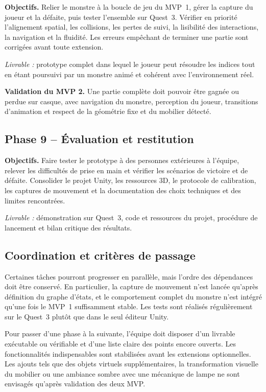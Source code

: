 \documentclass[11pt,a4paper]{article}
\begin{document}
\textbf{Objectifs.} Relier le monstre à la boucle de jeu du MVP~1, gérer la capture du joueur et la défaite, puis tester l'ensemble sur Quest~3. Vérifier en priorité l'alignement spatial, les collisions, les pertes de suivi, la lisibilité des interactions, la navigation et la fluidité. Les erreurs empêchant de terminer une partie sont corrigées avant toute extension.

\textit{Livrable :} prototype complet dans lequel le joueur peut résoudre les indices tout en étant poursuivi par un monstre animé et cohérent avec l'environnement réel.

\textbf{Validation du MVP 2.} Une partie complète doit pouvoir être gagnée ou perdue sur casque, avec navigation du monstre, perception du joueur, transitions d'animation et respect de la géométrie fixe et du mobilier détecté.

\subsection*{Phase 9 -- Évaluation et restitution}

\textbf{Objectifs.} Faire tester le prototype à des personnes extérieures à l'équipe, relever les difficultés de prise en main et vérifier les scénarios de victoire et de défaite. Consolider le projet Unity, les ressources 3D, le protocole de calibration, les captures de mouvement et la documentation des choix techniques et des limites rencontrées.

\textit{Livrable :} démonstration sur Quest~3, code et ressources du projet, procédure de lancement et bilan critique des résultats.

\subsection*{Coordination et critères de passage}

Certaines tâches pourront progresser en parallèle, mais l'ordre des dépendances doit être conservé. En particulier, la capture de mouvement n'est lancée qu'après définition du graphe d'états, et le comportement complet du monstre n'est intégré qu'une fois le MVP~1 suffisamment stable. Les tests sont réalisés régulièrement sur le Quest~3 plutôt que dans le seul éditeur Unity.

Pour passer d'une phase à la suivante, l'équipe doit disposer d'un livrable exécutable ou vérifiable et d'une liste claire des points encore ouverts. Les fonctionnalités indispensables sont stabilisées avant les extensions optionnelles. Les ajouts tels que des objets virtuels supplémentaires, la transformation visuelle du mobilier ou une ambiance sombre avec une mécanique de lampe ne sont envisagés qu'après validation des deux MVP.
\end{document}

